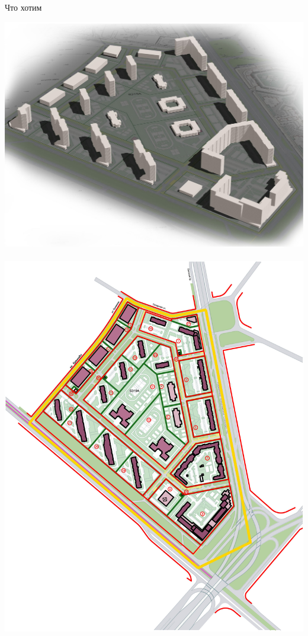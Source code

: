 \documentclass[14pt, fleqn, xcolor={dvipsnames, table}]{beamer}
\begin{document}
        \begin{frame}{Что хотим}
            \begin{center}
                \includegraphics[scale=0.08]{3d.jpg}~
                \includegraphics[scale=0.28]{fill.jpg}
            \end{center}                 
        \end{frame}
        
\end{document}
